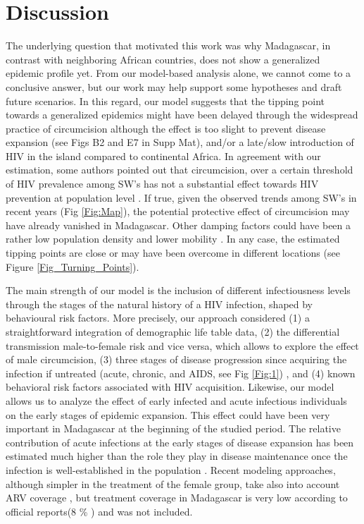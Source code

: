 \documentclass[preprint,12pt]{elsarticle}
\begin{document}
\section{Discussion}
 The underlying question that motivated this work was why Madagascar, in contrast with neighboring African countries, does not show a generalized epidemic profile yet. From our model-based analysis alone, we cannot come to a conclusive answer, but our work may help support some hypotheses and draft future scenarios. In this regard, our model suggests that the tipping point towards a generalized epidemics might have been delayed through the widespread practice of circumcision although the effect is too slight to prevent disease expansion (see Figs B2 and E7 in Supp Mat), and/or a late/slow introduction of HIV in the island compared to continental Africa. In agreement with our estimation, some authors pointed out that circumcision, over a certain threshold of HIV prevalence among SW’s has not a substantial effect towards HIV prevention at population level \cite{Talbott2007}. If true, given the observed trends among SW's in recent years (Fig \ref{Fig:Map}), the potential protective effect of circumcision may have already vanished in Madagascar. Other damping factors could have been a rather low population density and lower mobility \cite{Raberahona2020}. In any case, the estimated tipping points are close or may have been overcome in different locations (see Figure \ref{Fig_Turning_Points}). 
 \smallskip
    
The main strength of our model is the inclusion of different infectiousness levels through the stages of the natural history of a HIV infection, shaped by behavioural risk factors. More precisely, our approach considered (1) a straightforward integration of demographic life table data, (2) the differential transmission male-to-female risk and vice versa, which allows to explore the effect of male circumcision, (3) three stages of disease progression since acquiring the infection if untreated (acute, chronic, and AIDS, see Fig \ref{Fig:1}) , and (4) known behavioral risk factors associated with HIV acquisition. Likewise, our model allows us to analyze the effect of early infected and acute infectious individuals on the early stages of epidemic expansion. This effect could have been very important in Madagascar at the beginning of the studied period. The relative contribution of acute infections at the early stages of disease expansion has been estimated much higher than the role they play in disease maintenance once the infection is well-established in the population \cite{Fiebig2003}. Recent modeling approaches, although simpler in the treatment of the female group, take also into account ARV coverage \cite{Omondi2018,Omondi2019}, but treatment coverage in Madagascar is   very low according to official reports(8 \% \citet{UNAIDS2019}) and was not included. 
\smallskip
 	  
\end{document}
